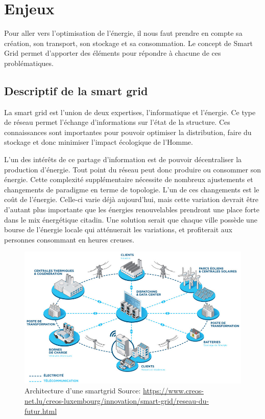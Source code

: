 \chapter{Enjeux}

Pour aller vers l'optimisation de l'énergie, il nous faut prendre en compte sa création,
son transport, son stockage et sa consommation.
Le concept de Smart Grid permet d'apporter des éléments pour répondre à chacune de ces problématiques.

\section{Descriptif de la smart grid}
La smart grid est l'union de deux expertises, l'informatique et l'énergie.
Ce type de réseau permet l'échange d'informations sur l'état de la structure.
Ces connaissances sont importantes pour pouvoir optimiser la distribution, faire du stockage
et donc minimiser l'impact écologique de l'Homme.

L'un des intérêts de ce partage d'information est de pouvoir décentraliser la production d'énergie.
Tout point du réseau peut donc produire ou consommer son énergie.
Cette complexité supplémentaire nécessite de nombreux ajustements et changements de paradigme en terme de topologie.
L'un de ces changements est le coût de l'énergie. Celle-ci varie déjà aujourd’hui, mais cette variation
devrait être d'autant plus importante que les énergies renouvelables prendront une place forte dans
le mix énergétique citadin. Une solution serait que chaque ville possède une bourse de l'énergie
locale qui atténuerait les variations, et profiterait aux personnes consommant en heures creuses.

\begin{figure}[h]
    \centering
    \includegraphics[scale=0.40]{media/smart_city_lux.jpg}
    \caption{
        Architecture d'une smartgrid\newline
        \tiny{Source: \url{https://www.creos-net.lu/creos-luxembourg/innovation/smart-grid/reseau-du-futur.html}}
    }
\end{figure}


